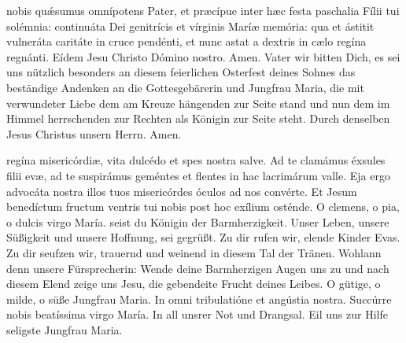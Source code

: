 \documentclass[fontsize=10pt,paper=A5,twoside,BCOR=1mm,DIV=21,headinclude]{scrarticle}
\begin{document}

\vspace{.3em}

\begin{paracol}{2}\pcb
{} nobis qu\'æsumus omnípotens Pater, et præcípue inter hæc festa paschalia Fílii tui solémnia: continuáta Dei genitrícis et vírginis Maríæ memória: qua et ástitit vulneráta caritáte in cruce pendénti, et nunc astat a dextris in cælo regína regnánti. Eídem Jesu Christo Dómino nostro. \R Amen.
	\switchcolumn
	 Vater wir bitten Dich, es sei uns nützlich besonders an diesem feierlichen Osterfest deines Sohnes das beständige Andenken an die Gottesgebärerin und Jungfrau Maria, die mit verwundeter Liebe dem am Kreuze hängenden zur Seite stand und nun dem im Himmel herrschenden zur Rechten als Königin zur Seite steht. Durch denselben Jesus Christus unsern Herrn. \R Amen.
\end{paracol}


\vspace{.3em}

{\centering


}

\begin{paracol}{2}\pcb
{} regína misericórdiæ, vita dulcédo et spes nostra salve. Ad te clamámus éxsules filii evæ, ad te suspirámus geméntes et flentes in hac lacrimárum valle. Eja ergo advocáta nostra illos tuos misericórdes óculos ad nos convérte. Et Jesum benedíctum fructum ventris tui nobis post hoc exílium osténde. O clemens, o pia, o dulcis virgo María.
	\switchcolumn
	 seist du Königin der Barmherzigkeit. Unser Leben, unsere Süßigkeit und unsere Hoffnung, sei gegrüßt. Zu dir rufen wir, elende Kinder Evas. Zu dir seufzen wir, trauernd und weinend in diesem Tal der Tränen. Wohlann denn unsere Fürsprecherin: Wende deine Barmherzigen Augen uns zu und nach diesem Elend zeige uns Jesu, die gebendeite Frucht deines Leibes. O gütige, o milde, o süße Jungfrau Maria.
\switchcolumn*
\V In omni tribulatióne et angústia nostra.
\R Succúrre nobis beatíssima virgo María.
	\switchcolumn
	\V In all unsrer Not und Drangsal.
	\R Eil uns zur Hilfe seligste Jungfrau Maria.
\end{paracol}

\end{document}
